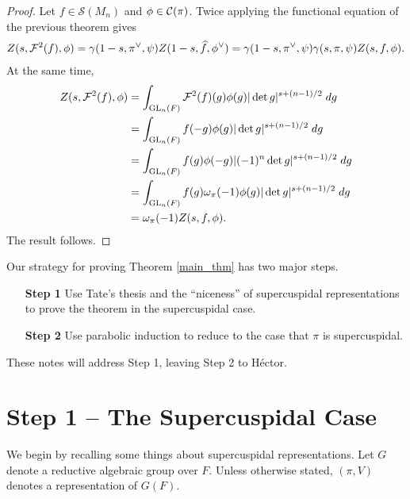 \documentclass[11pt]{article}
\renewcommand{\S}{\mathscr{S}}
\begin{document}
\begin{proof}
Let $f\in\S(M_n)$ and $\phi\in\mathcal{C}(\pi)$. Twice applying the functional equation of the previous theorem gives 
\begin{align*}
Z(s,\mathcal{F}^2(f),\phi)
=\gamma(1-s,\pi^{\vee},\psi)Z(1-s,\widehat{f},\phi^{\vee})
=\gamma(1-s,\pi^{\vee},\psi)\gamma(s,\pi,\psi)Z(s,f,\phi).
\end{align*}
At the same time,
\begin{align*}
Z(s,\mathcal{F}^2(f),\phi)
&=\int_{\textup{GL}_n(F)}\mathcal{F}^2(f)(g)\phi(g)|\det g|^{s+(n-1)/2}\;dg \\
&=\int_{\textup{GL}_n(F)}f(-g)\phi(g)|\det g|^{s+(n-1)/2}\;dg \\
&=\int_{\textup{GL}_n(F)}f(g)\phi(-g)|(-1)^n\det g|^{s+(n-1)/2}\;dg \\
&=\int_{\textup{GL}_n(F)}f(g)\omega_{\pi}(-1)\phi(g)|\det g|^{s+(n-1)/2}\;dg \\
&=\omega_{\pi}(-1)Z(s,f,\phi).
\end{align*}
The result follows.
\end{proof}

Our strategy for proving Theorem \ref{main_thm} has two major steps.
\begin{itemize}
\item[\textbf{Step 1}] Use Tate's thesis and the ``niceness'' of supercuspidal representations to prove the theorem in the supercuspidal case.
\item[\textbf{Step 2}] Use parabolic induction to reduce to the case that $\pi$ is supercuspidal.
\end{itemize}

These notes will address Step 1, leaving Step 2 to H\'{e}ctor.

\section{Step 1 -- The Supercuspidal Case}
We begin by recalling some things about supercuspidal representations. Let $G$ denote a reductive algebraic group over $F$. Unless otherwise stated, $(\pi,V)$ denotes a representation of $G(F)$.
\end{document}
